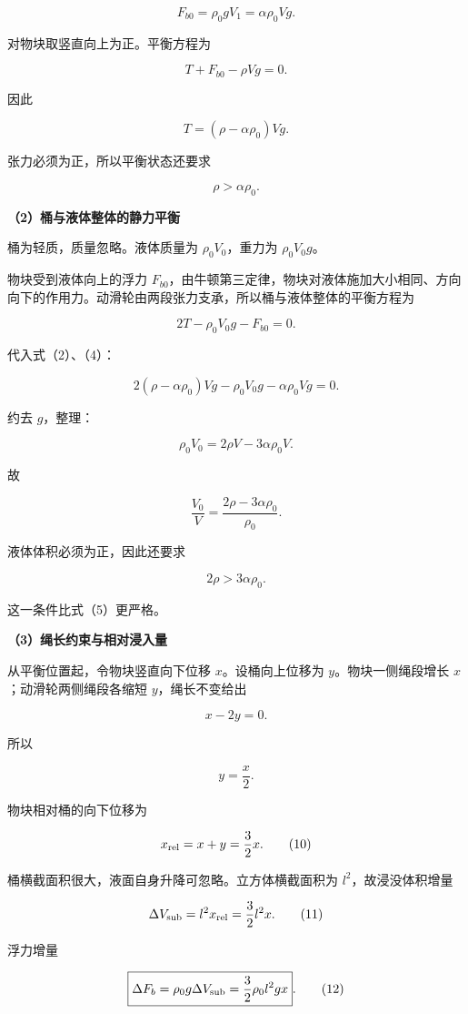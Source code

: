 \documentclass[12pt,a4paper,UTF8]{ctexart}
\begin{document}
\[
F_{b0}=\rho_0gV_1=\alpha\rho_0Vg.
\tag{2}
\]

对物块取竖直向上为正。平衡方程为

\[
T+F_{b0}-\rho Vg=0.
\tag{3}
\]

因此

\[
T=(\rho-\alpha\rho_0)Vg.
\tag{4}
\]

张力必须为正，所以平衡状态还要求

\[
\rho>\alpha\rho_0.
\tag{5}
\]

\textbf{（2）桶与液体整体的静力平衡}

桶为轻质，质量忽略。液体质量为 \(\rho_0V_0\)，重力为 \(\rho_0V_0g\)。

物块受到液体向上的浮力
\(F_{b0}\)，由牛顿第三定律，物块对液体施加大小相同、方向向下的作用力。动滑轮由两段张力支承，所以桶与液体整体的平衡方程为

\[
2T-\rho_0V_0g-F_{b0}=0.
\tag{6}
\]

代入式（2）、（4）：

\[
2(\rho-\alpha\rho_0)Vg
-\rho_0V_0g
-\alpha\rho_0Vg=0.
\]

约去 \(g\)，整理：

\[
\rho_0V_0
=2\rho V-3\alpha\rho_0V.
\]

故

\[
\boxed{
\frac{V_0}{V}
=\frac{2\rho-3\alpha\rho_0}{\rho_0}
}.
\tag{7}
\]

液体体积必须为正，因此还要求

\[
2\rho>3\alpha\rho_0.
\tag{8}
\]

这一条件比式（5）更严格。

\textbf{（3）绳长约束与相对浸入量}

从平衡位置起，令物块竖直向下位移 \(x\)。设桶向上位移为
\(y\)。物块一侧绳段增长 \(x\)；动滑轮两侧绳段各缩短 \(y\)，绳长不变给出

\[
x-2y=0.
\]

所以

\[
\boxed{y=\frac x2}.
\tag{9}
\]

物块相对桶的向下位移为

\[
x_{\rm rel}=x+y=\frac32x.
\tag{10}
\]

桶横截面积很大，液面自身升降可忽略。立方体横截面积为
\(l^2\)，故浸没体积增量

\[
\Delta V_{\rm sub}
=l^2x_{\rm rel}
=\frac32l^2x.
\tag{11}
\]

浮力增量

\[
\boxed{
\Delta F_b
=\rho_0g\Delta V_{\rm sub}
=\frac32\rho_0l^2gx
}.
\tag{12}
\]
\end{document}
